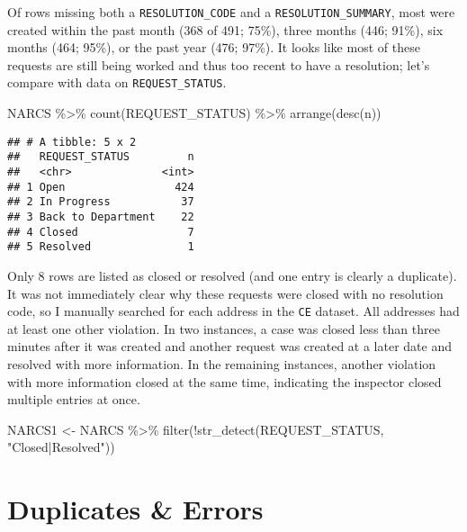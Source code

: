 \documentclass[
]{book}
\newenvironment{Shaded}{\begin{snugshade}}{\end{snugshade}}
\newcommand{\FunctionTok}[1]{\textcolor[rgb]{0.00,0.00,0.00}{#1}}
\newcommand{\NormalTok}[1]{#1}
\newcommand{\OtherTok}[1]{\textcolor[rgb]{0.56,0.35,0.01}{#1}}
\newcommand{\SpecialCharTok}[1]{\textcolor[rgb]{0.00,0.00,0.00}{#1}}
\newcommand{\StringTok}[1]{\textcolor[rgb]{0.31,0.60,0.02}{#1}}
\begin{document}
Of rows missing both a \texttt{RESOLUTION\_CODE} and a \texttt{RESOLUTION\_SUMMARY}, most were created within the past month (368 of 491; 75\%), three months (446; 91\%), six months (464; 95\%), or the past year (476; 97\%). It looks like most of these requests are still being worked and thus too recent to have a resolution; let's compare with data on \texttt{REQUEST\_STATUS}.

\begin{Shaded}
\begin{Highlighting}[]
\NormalTok{NARCS }\SpecialCharTok{\%\textgreater{}\%} \FunctionTok{count}\NormalTok{(REQUEST\_STATUS) }\SpecialCharTok{\%\textgreater{}\%} \FunctionTok{arrange}\NormalTok{(}\FunctionTok{desc}\NormalTok{(n))}
\end{Highlighting}
\end{Shaded}

\begin{verbatim}
## # A tibble: 5 x 2
##   REQUEST_STATUS         n
##   <chr>              <int>
## 1 Open                 424
## 2 In Progress           37
## 3 Back to Department    22
## 4 Closed                 7
## 5 Resolved               1
\end{verbatim}

Only 8 rows are listed as closed or resolved (and one entry is clearly a duplicate). It was not immediately clear why these requests were closed with no resolution code, so I manually searched for each address in the \texttt{CE} dataset. All addresses had at least one other violation. In two instances, a case was closed less than three minutes after it was created and another request was created at a later date and resolved with more information. In the remaining instances, another violation with more information closed at the same time, indicating the inspector closed multiple entries at once.

\begin{Shaded}
\begin{Highlighting}[]
\NormalTok{NARCS1 }\OtherTok{\textless{}{-}}\NormalTok{ NARCS }\SpecialCharTok{\%\textgreater{}\%} \FunctionTok{filter}\NormalTok{(}\SpecialCharTok{!}\FunctionTok{str\_detect}\NormalTok{(REQUEST\_STATUS, }\StringTok{"Closed|Resolved"}\NormalTok{))}
\end{Highlighting}
\end{Shaded}

\hypertarget{duplicates-errors}{%
\section{Duplicates \& Errors}\label{duplicates-errors}}
\end{document}

